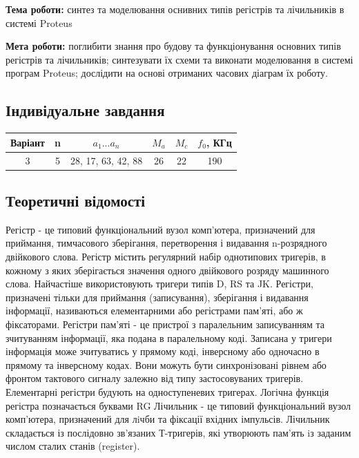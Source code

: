 \documentclass[12pt]{extarticle}
\begin{document}
\textbf{Тема роботи:} синтез та моделювання оснивних 
типів регістрів та лічильників в системі Proteus

\vspace{12pt}

\textbf{Мета роботи:} поглибити знання про будову та функціонування основних типів
регістрів та лічильників; синтезувати їх схеми та виконати
моделювання в системі програм Proteus; дослідити на основі
отриманих часових діаграм їх роботу.

\subsection*{Індивідуальне завдання}
\begin{center}
    \begin{tabular}{| c | c | c | c | c | c |}
        \hline
        Варіант & n & $a_1 ... a_n$ & $M_a$ & $M_c$ & $f_0$, КГц\\
        \hline
           3  & 5 & 28, 17, 63, 42, 88 & 26 &   22  &    190\\
        \hline
   
    \end{tabular}
\end{center}

\subsection*{Теоретичні відомості}
Регістр - це типовий функціональний вузол комп’ютера, призначений для
приймання, тимчасового зберігання, перетворення і видавання n-розрядного
двійкового слова. Регістр містить регулярний набір однотипових тригерів, в
кожному з яких зберігається значення одного двійкового розряду машинного
слова. Найчастіше використовують тригери типів D, RS та JK.
Регістри, призначені тільки для приймання (записування), зберігання і
видавання інформації, називаються елементарними або регістрами пам’яті, або ж
фіксаторами. Регістри пам’яті - це пристрої з паралельним записуванням
та зчитуванням інформації, яка подана в паралельному коді. Записана у тригери
інформація може зчитуватись у прямому коді, інверсному або одночасно в прямому
та інверсному кодах.
Вони можуть бути синхронізовані рівнем або фронтом тактового сигналу
залежно від типу застосовуваних тригерів. Елементарні регістри будують на
одноступеневих тригерах. Логічна функція регістра позначається буквами RG
Лічильник - це типовий функціональний вузол комп'ютера, призначений для
лiчби та фіксації вхідних імпульсів. Лічильник складається із послідовно зв’язаних
Т-тригерів, які утворюють пам’ять iз заданим числом сталих станів 
(register).
\end{document}
